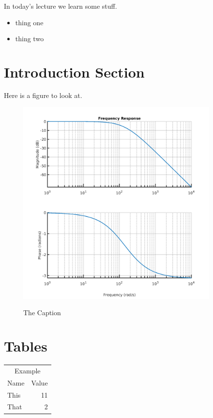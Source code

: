 \documentclass{article}
\begin{document}
\maketitle

In today's lecture we learn some stuff.

\begin{itemize}
\item thing one
\item thing two
\end{itemize}

\section{Introduction Section}

Here is a figure to look at.

\begin{figure}
  \centering
  \includegraphics[width=4in, alt={Description Here}]{lecture20_1.png}
  \caption{The Caption}
\end{figure}

\section{Tables}

\begin{tabular}{lr}
\multicolumn{2}{c}{Example}\\
Name &Value\\
This & 11 \\
That & 2
\end{tabular}
\end{document}
